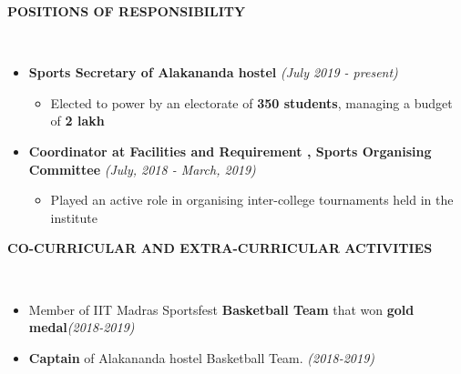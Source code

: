 \documentclass[a4paper,8pt]{article}
\newcommand{\isep}{-2 pt}
\newcommand{\lsep}{-0.5cm}
\newcommand{\resheading}[1]{{\small \colorbox{mygrey}{\begin{minipage}{0.975\textwidth}{\textbf{#1 \vphantom{p\^{E}}}}\end{minipage}}}}
\begin{document}
\resheading{\textbf{POSITIONS OF RESPONSIBILITY
} }\\[\lsep]
\vspace{1mm}
\begin{itemize}
    \item \textbf{Sports Secretary of Alakananda hostel 
    }\hfill
    \emph{(July 2019 - present)} \\[-0.6cm]
	    \begin{itemize}\itemsep \isep
	    \item {Elected to power by an electorate of \textbf{350 students}, managing a budget of \textbf{2 lakh}}
	\end{itemize}
	
	\item \textbf{Coordinator at Facilities and Requirement , Sports Organising Committee 
    }\hfill
    \emph{(July, 2018 - March, 2019)} \\[-0.6cm]
	    \begin{itemize}\itemsep \isep
	    \item Played an active role in organising inter-college tournaments held in the institute 
	\end{itemize}
	
\end{itemize}

\resheading{\textbf{CO-CURRICULAR AND EXTRA-CURRICULAR ACTIVITIES
} }\\[\lsep]
\vspace{1mm}

\begin{itemize}
\item Member of IIT Madras Sportsfest \textbf{Basketball Team } that won \textbf{gold medal}\hfill \emph{(2018-2019)} \\[-0.6cm]
\item \textbf{Captain} of Alakananda hostel Basketball Team. \hfill \emph{(2018-2019)} \\[-0.6cm]
\end{itemize}
\end{document}
